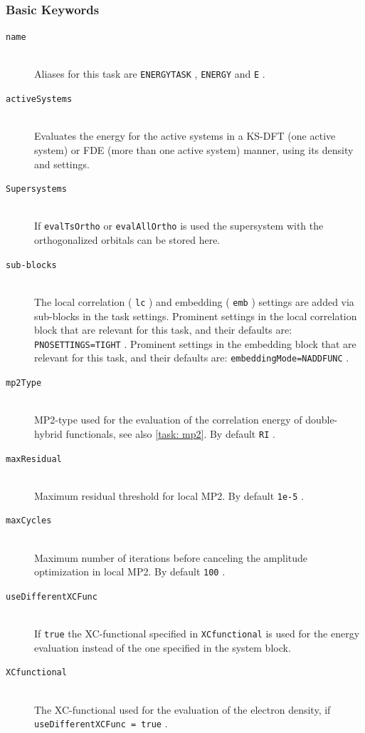 \documentclass[bibliography=totocnumbered,a4paper,10pt,oneside]{scrbook}
\newcommand{\ttt}[1]{%
  \begingroup\setlength{\fboxsep}{1pt}%
  \colorbox{serenity-green!30}{\texttt{\hspace*{2pt}\vphantom{(g}#1\hspace*{2pt}}}%
  \endgroup
}
\begin{document}
\subsubsection{Basic Keywords}
\begin{description}
  \item [\texttt{name}]\hfill \\
  Aliases for this task are \ttt{ENERGYTASK}, \ttt{ENERGY} and \ttt{E}.
  \item [\texttt{activeSystems}]\hfill \\
   Evaluates the energy for the active systems in a KS-DFT (one active system)
   or FDE (more than one active system) manner, using its density and settings.
   \item [\texttt{Supersystems}]\hfill \\
   If \ttt{evalTsOrtho} or \ttt{evalAllOrtho} is used the supersystem with the orthogonalized orbitals can be 
   stored here.
   \item [\texttt{sub-blocks}]\hfill \\
   The local correlation (\ttt{lc}) and embedding (\ttt{emb}) settings are added via sub-blocks in the task settings.
   Prominent settings in the local correlation block that are relevant for this task, and their defaults are:
    \ttt{PNOSETTINGS=TIGHT}.
    Prominent settings in the embedding block that are relevant for this task, and their defaults are: \ttt{embeddingMode=NADDFUNC}.
    \item [\texttt{mp2Type}]\hfill \\
    MP2-type used for the evaluation of the correlation energy of double-hybrid functionals, see also \ref{task: mp2}. By default \ttt{RI}.
    \item [\texttt{maxResidual}]\hfill \\
    Maximum residual threshold for local MP2. By default \ttt{1e-5}.
    \item [\texttt{maxCycles}]\hfill \\
    Maximum number of iterations before canceling the amplitude optimization in local MP2. By default \ttt{100}.
    \item [\texttt{useDifferentXCFunc}]\hfill \\
    If \ttt{true} the XC-functional specified in \ttt{XCfunctional} is used for the energy evaluation instead of the
    one specified in the system block.
    \item [\texttt{XCfunctional}]\hfill \\
    The XC-functional used for the evaluation of the electron density, if \ttt{useDifferentXCFunc = true}.

\end{description}
\end{document}
